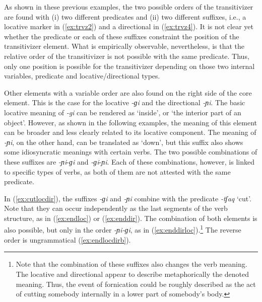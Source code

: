 \documentclass[output=paper]{langscibook}
\begin{document}
As shown in these previous examples, the two possible orders of the transitivizer are found with (i) two different predicates and (ii) two different suffixes, i.e., a locative marker in (\ref{ex:trvz2}) and a directional in (\ref{ex:trvz4}). It is not clear yet whether the predicate or each of these suffixes constraint the position of the transitivizer element. What is empirically observable, nevertheless, is that the relative order of the transitivizer is not possible with the same predicate. Thus, only one position is possible for the transitivizer depending on those two internal variables, predicate and locative/directional types.

Other elements with a variable order are also found on the right side of the core element. This is the case for the locative \textit{-ɡi} and the directional \textit{-ɲi}. The basic locative meaning of \textit{-gi} can be rendered as `inside', or `the interior part of an object'. However, as shown in the following examples, the meaning of this element can be broader and less clearly related to its locative component. The meaning of \textit{-ɲi}, on the other hand, can be translated as `down', but this suffix also shows some idiosyncratic meanings with certain verbs. The two possible combinations of these suffixes are \textit{-ɲi}-\textit{ɡi} and \textit{-ɡi}-\textit{ɲi}. Each of these combinations, however, is linked  to specific types of verbs, as both of them are not attested with the same predicate. 

In (\ref{ex:cutlocdir}), the suffixes \textit{-ɡi} and \textit{-ɲi} combine with the predicate \textit{-tʃaq} `cut'. Note that they can occur independently as the last segments of the verb structure, as in (\ref{ex:endloc}) or (\ref{ex:enddir}). The combination of both elements is also possible, but only in the order \textit{-ɲi-ɡi}, as in (\ref{ex:enddirloc}).\footnote{Note that the combination of these suffixes also changes the verb meaning. The locative and directional appear to describe metaphorically the denoted meaning. Thus, the event of fornication could be roughly described as the act of cutting somebody internally in a lower part of somebody's body.} The reverse order is ungrammatical (\ref{ex:endlocdirb}).
\end{document}
